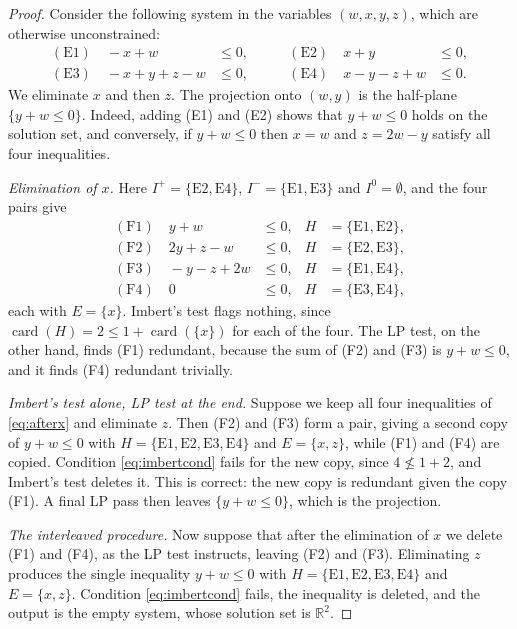 \documentclass[10pt,a4paper]{amsart}
\newcommand{\Ineg}{I^{-}}
\newcommand{\Ipos}{I^{+}}
\newcommand{\Izero}{I^{0}}
\newcommand{\card}{\operatorname{card}}
\begin{document}
\begin{proof}
Consider the following system in the variables $(w,x,y,z)$, which are otherwise unconstrained:
\begin{equation}
\begin{aligned}
(\mathrm{E}1)\quad -x+w &\le 0, &\qquad (\mathrm{E}2)\quad x+y &\le 0,\\
(\mathrm{E}3)\quad -x+y+z-w &\le 0, &\qquad (\mathrm{E}4)\quad x-y-z+w &\le 0.
\end{aligned}
\label{eq:counterexample}
\end{equation}
We eliminate $x$ and then $z$. The projection onto $(w,y)$ is the half-plane $\{y+w\le 0\}$. Indeed, adding (E1) and (E2) shows that $y+w\le 0$ holds on the solution set, and conversely, if $y+w\le 0$ then $x=w$ and $z=2w-y$ satisfy all four inequalities.

\emph{Elimination of $x$.} Here $\Ipos=\{\mathrm{E}2,\mathrm{E}4\}$, $\Ineg=\{\mathrm{E}1,\mathrm{E}3\}$ and $\Izero=\emptyset$, and the four pairs give
\begin{equation}
\begin{aligned}
(\mathrm{F}1)\quad y+w&\le 0, & H&=\{\mathrm{E}1,\mathrm{E}2\},\\
(\mathrm{F}2)\quad 2y+z-w&\le 0, & H&=\{\mathrm{E}2,\mathrm{E}3\},\\
(\mathrm{F}3)\quad -y-z+2w&\le 0, & H&=\{\mathrm{E}1,\mathrm{E}4\},\\
(\mathrm{F}4)\quad 0&\le 0, & H&=\{\mathrm{E}3,\mathrm{E}4\},
\end{aligned}
\label{eq:afterx}
\end{equation}
each with $E=\{x\}$. Imbert's test flags nothing, since $\card(H)=2\le 1+\card(\{x\})$ for each of the four. The LP test, on the other hand, finds (F1) redundant, because the sum of (F2) and (F3) is $y+w\le 0$, and it finds (F4) redundant trivially.

\emph{Imbert's test alone, LP test at the end.} Suppose we keep all four inequalities of \eqref{eq:afterx} and eliminate $z$. Then (F2) and (F3) form a pair, giving a second copy of $y+w\le 0$ with $H=\{\mathrm{E}1,\mathrm{E}2,\mathrm{E}3,\mathrm{E}4\}$ and $E=\{x,z\}$, while (F1) and (F4) are copied. Condition \eqref{eq:imbertcond} fails for the new copy, since $4\not\le 1+2$, and Imbert's test deletes it. This is correct: the new copy is redundant given the copy (F1). A final LP pass then leaves $\{y+w\le 0\}$, which is the projection.

\emph{The interleaved procedure.} Now suppose that after the elimination of $x$ we delete (F1) and (F4), as the LP test instructs, leaving (F2) and (F3). Eliminating $z$ produces the single inequality $y+w\le 0$ with $H=\{\mathrm{E}1,\mathrm{E}2,\mathrm{E}3,\mathrm{E}4\}$ and $E=\{x,z\}$. Condition \eqref{eq:imbertcond} fails, the inequality is deleted, and the output is the empty system, whose solution set is $\mathbb{R}^2$.
\end{proof}
\end{document}
